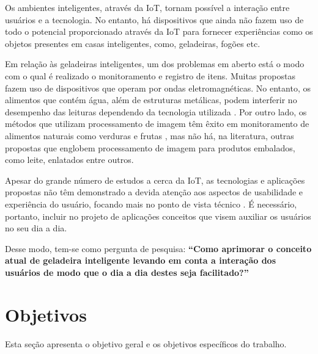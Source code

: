Os ambientes inteligentes, através da IoT, tornam possível a interação entre usuários e a tecnologia. No entanto, há dispositivos que ainda não fazem uso de todo o potencial proporcionado através da IoT para fornecer experiências como os objetos presentes em casas inteligentes, como, geladeiras, fogões etc.

Em relação às geladeiras inteligentes, um dos problemas em aberto está o modo com o qual é realizado o monitoramento e registro de itens. Muitas propostas fazem uso de dispositivos que operam por ondas eletromagnéticas. No entanto, os alimentos que contém água, além de estruturas metálicas, podem interferir no desempenho das leituras dependendo da tecnologia utilizada \cite{Periyasamy2015, Qing2007}. Por outro lado, os métodos que utilizam processamento de imagem têm êxito em monitoramento de alimentos naturais como verduras e frutas \cite{Shweta2017}, mas não há, na literatura, outras propostas que englobem processamento de imagem para produtos embalados, como leite, enlatados entre outros.

Apesar do grande número de estudos a cerca da IoT, as tecnologias e aplicações propostas não têm demonstrado a devida atenção aos aspectos de usabilidade e experiência do usuário, focando mais no ponto de vista técnico \cite{Koreshoff2013, Wilson2015}. É necessário, portanto, incluir no projeto de aplicações conceitos que visem auxiliar os usuários no seu dia a dia.

Desse modo, tem-se como pergunta de pesquisa: \textbf{``Como aprimorar o conceito atual de geladeira inteligente levando em conta a interação dos usuários de modo que o dia a dia destes seja facilitado?''}


\section{Objetivos}
Esta seção apresenta o objetivo geral e os objetivos específicos do trabalho.

